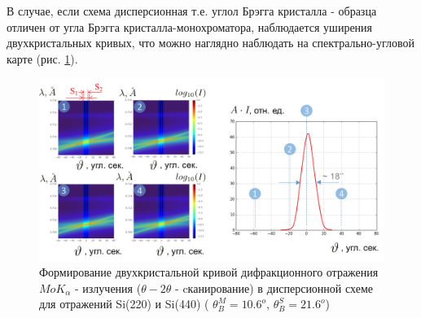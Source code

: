 В случае, если схема дисперсионная т.е. углол Брэгга кристалла - образца отличен от угла Брэгга кристалла-монохроматора,
наблюдается уширения двухкристальных кривых, что можно наглядно наблюдать
на спектрально-угловой карте (рис. \ref{ris:double_crystal_form_kdo_dissp}).
 \begin{figure}[H]
   \centering
   \includegraphics[width=1\textwidth]{images/double_crystal_form_kdo_dissp.png}
   \caption{Формирование двухкристальной кривой дифракционного отражения
   $MoK_{\alpha}$ - излучения ($\theta - 2\theta$ - cканирование) в дисперсионной схеме для отражений Si(220) и Si(440)
   ( $\theta_B^M = 10.6^o$, $\theta_B^S = 21.6^o$)}
   \label{ris:double_crystal_form_kdo_dissp}
 \end{figure}
